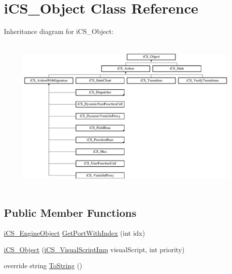 \hypertarget{classi_c_s___object}{\section{i\+C\+S\+\_\+\+Object Class Reference}
\label{classi_c_s___object}
}
Inheritance diagram for i\+C\+S\+\_\+\+Object\+:\begin{figure}[H]
\begin{center}
\leavevmode
\includegraphics[height=7.979275cm]{classi_c_s___object}
\end{center}
\end{figure}
\subsection*{Public Member Functions}
\begin{DoxyCompactItemize}
\item 
\hyperlink{classi_c_s___engine_object}{i\+C\+S\+\_\+\+Engine\+Object} \hyperlink{classi_c_s___object_a01abb9a5939a8cef39e85706fb9cb7e5}{Get\+Port\+With\+Index} (int idx)
\item 
\hyperlink{classi_c_s___object_a960508c8de18c65e002ab805cd637991}{i\+C\+S\+\_\+\+Object} (\hyperlink{classi_c_s___visual_script_imp}{i\+C\+S\+\_\+\+Visual\+Script\+Imp} visual\+Script, int priority)
\item 
override string \hyperlink{classi_c_s___object_ae5cf971ee11c563b3ea2c1184c7d1823}{To\+String} ()
\end{DoxyCompactItemize}
